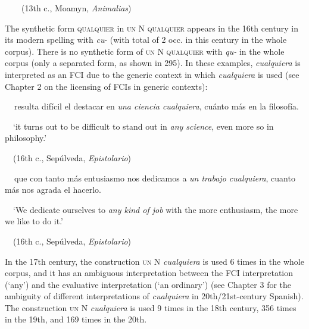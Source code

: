 \begin{styleStandard}
\ \ \ \ (13th c., Moamyn,\textit{ Animalias})
\end{styleStandard}

\begin{styleStandard}
The synthetic form \textsc{qualquier }in \textsc{un} N \textsc{qualquier} appears in the 16th century in its modern spelling with \textit{cu}{}- (with total of 2 occ. in this century in the whole corpus). There is no synthetic form of \textsc{un }N \textsc{qualquier }with \textit{qu-} in the whole corpus (only a separated form, as shown in 295). In these examples, \textit{cualquiera} is interpreted as an FCI due to the generic context in which \textit{cualquiera} is used (see Chapter 2 on the licensing of FCIs in generic contexts):
\end{styleStandard}

\begin{styleStandard}
\textbf{\ \ }resulta difícil el destacar en \textit{una ciencia cualquiera}, cuánto más en la filosofía. 
\end{styleStandard}

\begin{styleStandard}
\ \ ‘it turns out to be difficult to stand out in \textit{any science}, even more so in philosophy.’
\end{styleStandard}

\begin{styleStandard}
\ \ (16th c., Sepúlveda, \textit{Epistolario})
\end{styleStandard}

\begin{styleStandard}
\textbf{\ \ }que con tanto más entusiasmo nos dedicamos a \textit{un trabajo cualquiera}, cuanto más nos agrada el hacerlo. 
\end{styleStandard}

\begin{styleStandard}
\ \ ‘We dedicate ourselves to \textit{any kind of job} with the more enthusiasm, the more we like to do it.’
\end{styleStandard}

\begin{styleStandard}
\ \ (16th c., Sepúlveda, \textit{Epistolario})
\end{styleStandard}

\begin{styleStandard}
In the 17th century, the construction \textsc{un}\textit{ }N \textit{cualquiera} is used 6 times in the whole corpus, and it has an ambiguous interpretation between the FCI interpretation (‘any’) and the evaluative interpretation (‘an ordinary’) (see Chapter 3 for the ambiguity of different interpretations of \textit{cualquiera} in 20th/21st-century Spanish). The construction \textsc{un}\textit{ }N\textit{ cualquiera} is used 9 times in the 18th century, 356 times in the 19th, and 169 times in the 20th.
\end{styleStandard}

